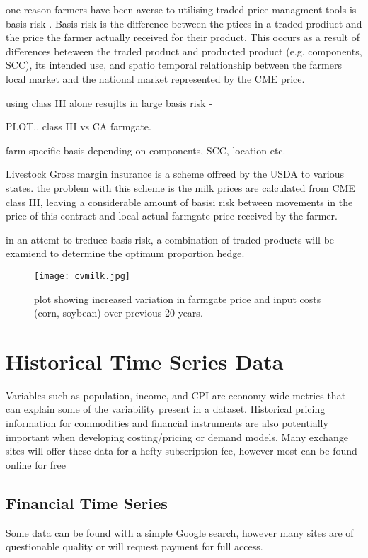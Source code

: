 \documentclass[11pt]{article}
\begin{document}
	
	one reason farmers have been averse to utilising traded price managment tools is basis risk \cite{Pennings1997}.
	Basis risk is the difference between the ptices in a traded prodiuct and the price the farmer actually received for their product. 
	This occurs as a result of differences beteween the traded product and producted product (e.g. components, SCC), its intended use, and spatio temporal relationship between the farmers local market and the national market represented by the CME price.


	using class III alone resujlts in large basis risk - 

	PLOT.. class III vs CA farmgate.


	farm specific basis depending on components, SCC, location etc.

	Livestock Gross margin insurance is a scheme offreed by the USDA to various states.
	the problem with this scheme is the milk prices are calculated from CME class III, leaving a considerable amount of basisi risk between movements in the price of this contract and local actual farmgate price received by the farmer.


	in an attemt to treduce basis risk, a combination of traded products will be examiend to determine the optimum proportion hedge.

	\begin{figure}[h!]
		\centering
		\texttt{[image: cvmilk.jpg]}
		\caption{plot showing increased variation in farmgate price and input costs (corn, soybean) over previous 20 years.}
	\end{figure}


\section{Historical Time Series Data}
	Variables such as population, income, and CPI are economy wide metrics that can explain some of the variability present in a dataset.
	Historical pricing information for commodities and financial instruments are also potentially important when developing costing/pricing or demand models.
	Many exchange sites will offer these data for a hefty subscription fee, however most can be found online for free

	\subsection{Financial Time Series}
	Some data can be found with a simple Google search, however many sites are of questionable quality or will request payment for full access.
\end{document}
